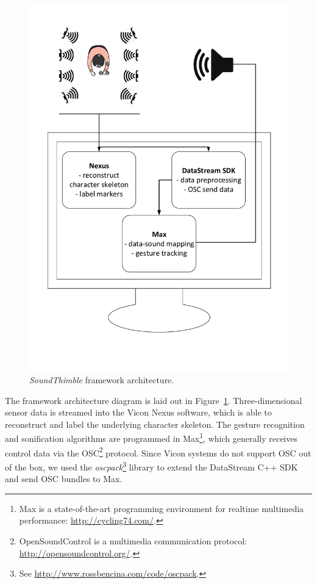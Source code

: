 \documentclass{nime-alternate}
\begin{document}

\begin{figure}[t]
	\centering
	\includegraphics[width=.65\columnwidth]{img/archi}
	\caption{\textit{SoundThimble} framework architecture.}
	\label{fig:archi}
\end{figure}

The framework architecture diagram is laid out in Figure~\ref{fig:archi}. Three-dimensional sensor data is streamed into the Vicon Nexus software, which is able to reconstruct and label the underlying character skeleton. The gesture recognition and sonification algorithms are programmed in Max\footnote{Max is a state-of-the-art programming environment for realtime multimedia performance: \url{http://cycling74.com/}.}, which generally receives control data via the OSC\footnote{OpenSoundControl is a multimedia communication protocol: \url{http://opensoundcontrol.org/}.} protocol. Since Vicon systems do not support OSC out of the box, we used the \textit{oscpack}\footnote{See \url{http://www.rossbencina.com/code/oscpack}.} library to extend the DataStream C++ SDK and send OSC bundles to Max.
\end{document}

